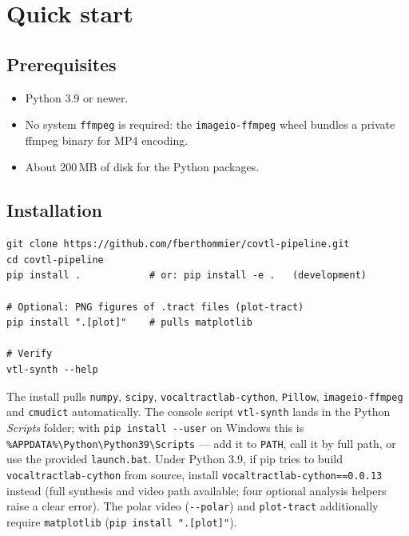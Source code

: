\documentclass[11pt,a4paper]{article}
\begin{document}
\section{Quick start}\label{sec:quickstart}

\subsection{Prerequisites}

\begin{itemize}[leftmargin=1.5em]
\item Python 3.9 or newer.
\item No system \texttt{ffmpeg} is required: the \texttt{imageio-ffmpeg}
      wheel bundles a private ffmpeg binary for MP4 encoding.
\item About 200\,MB of disk for the Python packages.
\end{itemize}

\subsection{Installation}

\begin{lstlisting}[style=shell]
git clone https://github.com/fberthommier/covtl-pipeline.git
cd covtl-pipeline
pip install .            # or: pip install -e .   (development)

# Optional: PNG figures of .tract files (plot-tract)
pip install ".[plot]"    # pulls matplotlib

# Verify
vtl-synth --help
\end{lstlisting}

The install pulls \texttt{numpy}, \texttt{scipy},
\texttt{vocaltractlab-cython}, \texttt{Pillow}, \texttt{imageio-ffmpeg}
and \texttt{cmudict} automatically. The console script
\texttt{vtl-synth} lands in the Python \emph{Scripts} folder; with
\texttt{pip install -{}-user} on Windows this is
\texttt{\%APPDATA\%\textbackslash Python\textbackslash Python39\textbackslash Scripts}
--- add it to \texttt{PATH}, call it by full path, or use the provided
\texttt{launch.bat}. Under Python 3.9, if pip tries to build
\texttt{vocaltractlab-cython} from source, install
\texttt{vocaltractlab-cython==0.0.13} instead (full synthesis and video
path available; four optional analysis helpers raise a clear error).
The polar video (\texttt{-{}-polar}) and \texttt{plot-tract}
additionally require \texttt{matplotlib} (\texttt{pip install
".[plot]"}).
\end{document}
